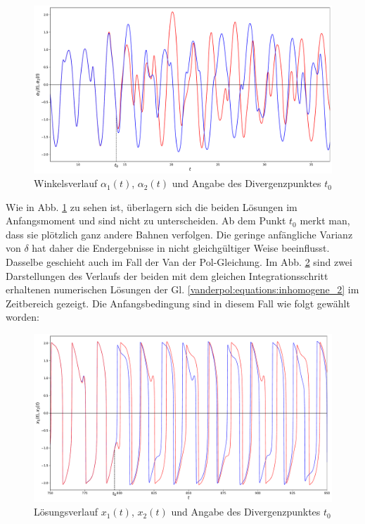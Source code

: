 \begin{figure}
\includegraphics[width=\textwidth]{papers/vanderpol/figures/initial_cond_DBLPEND.pdf}
\caption{Winkelsverlauf $\alpha_1(t)$, $\alpha_2(t)$ und Angabe des Divergenzpunktes $t_0$ \label{vanderpol:figures:init_cond_dbl_pend}}
\end{figure}
\noindent Wie in Abb. \ref{vanderpol:figures:init_cond_dbl_pend} zu sehen ist, überlagern sich die beiden Lösungen im Anfangsmoment und sind nicht zu unterscheiden. Ab dem Punkt $t_0$ merkt man, dass sie plötzlich ganz andere Bahnen verfolgen. Die geringe anfängliche Varianz von $\delta$ hat daher die Endergebnisse in nicht gleichgültiger Weise beeinflusst. Dasselbe geschieht auch im Fall der Van der Pol-Gleichung. Im  Abb. \ref{vanderpol:figures:init_cond_VDP} sind zwei Darstellungen des Verlaufs der beiden mit dem gleichen Integrationsschritt erhaltenen numerischen Lösungen der Gl. \ref{vanderpol:equations:inhomogene_2} im Zeitbereich gezeigt. Die Anfangsbedingung sind in diesem Fall wie folgt gewählt worden:

\begin{figure}
\includegraphics[width=\textwidth]{papers/vanderpol/figures/initial_cond_VDP.pdf}
\caption{Lösungsverlauf $x_1(t)$, $x_2(t)$ und Angabe des Divergenzpunktes $t_0$ \label{vanderpol:figures:init_cond_VDP}}
\end{figure}

